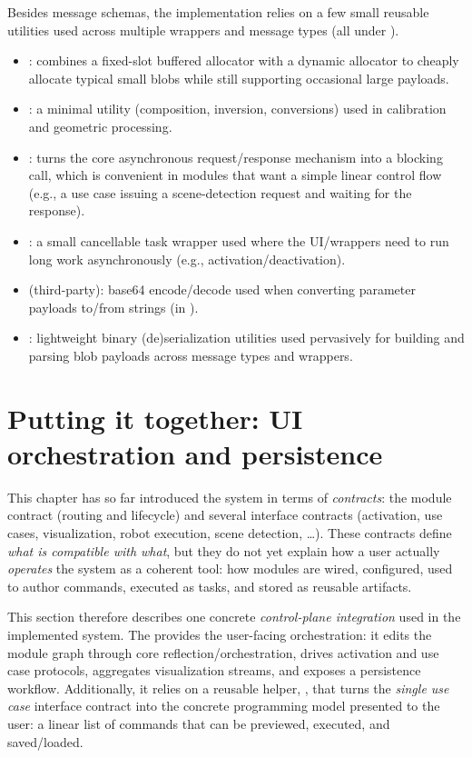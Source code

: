 Besides message schemas, the implementation relies on a few small reusable utilities used across multiple wrappers and message types (all under ).
\begin{itemize}
    \item {}: combines a fixed-slot buffered allocator with a dynamic allocator to cheaply allocate typical small blobs while still supporting occasional large payloads.
    \item {}: a minimal  utility (composition, inversion, conversions) used in calibration and geometric processing.
    \item {}: turns the core asynchronous request/response mechanism into a blocking call, which is convenient in modules that want a simple linear control flow (e.g., a use case issuing a scene-detection request and waiting for the response).
    \item {}: a small cancellable task wrapper used where the UI/wrappers need to run long work asynchronously (e.g., activation/deactivation).
    \item {} (third-party): base64 encode/decode used when converting  parameter payloads to/from strings (in ).
    \item {}: lightweight binary (de)serialization utilities used pervasively for building and parsing blob payloads across message types and wrappers.
\end{itemize}



\section{Putting it together: UI orchestration and persistence} \label{sec:ch3_putting_it_together}

This chapter has so far introduced the system in terms of \emph{contracts}: the module contract (routing and lifecycle) and several interface contracts (activation, use cases, visualization, robot execution, scene detection, \dots). These contracts define \emph{what is compatible with what}, but they do not yet explain how a user actually \emph{operates} the system as a coherent tool: how modules are wired, configured, used to author commands, executed as tasks, and stored as reusable artifacts.

This section therefore describes one concrete \emph{control-plane integration} used in the implemented system. The  provides the user-facing orchestration: it edits the module graph through core reflection/orchestration, drives activation and use case protocols, aggregates visualization streams, and exposes a persistence workflow. Additionally, it relies on a reusable helper, , that turns the \emph{single use case} interface contract into the concrete programming model presented to the user: a linear list of commands that can be previewed, executed, and saved/loaded.

